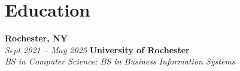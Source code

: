 \section{Education}

\begin{twocolentry}{
    \textbf{Rochester, NY} \\
    \textit{Sept 2021 – May 2025}
}{
    \textbf{University of Rochester} \\
    \textit{BS in Computer Science; BS in Business Information Systems}
}
\end{twocolentry}
